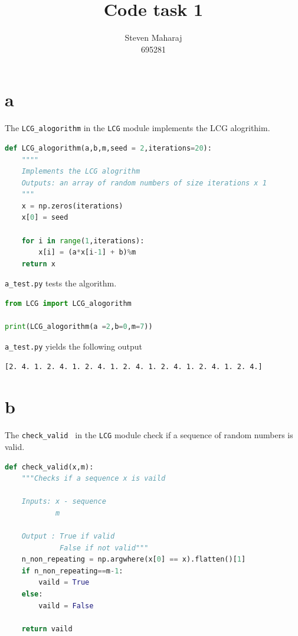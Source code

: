 \documentclass[12pt,a4paper]{article}
\author{Steven Maharaj\\695281}
\title{Code task 1}
\begin{document}
\maketitle

\section*{a}
The \texttt{LCG\_alogorithm} in the \texttt{LCG} module implements the LCG alogrithim. 
\begin{lstlisting}[language=Python, caption=LCG.LCG\_alogrithm]
def LCG_alogorithm(a,b,m,seed = 2,iterations=20):
    """"
    Implements the LCG alogrithm 
    Outputs: an array of random numbers of size iterations x 1
    """
    x = np.zeros(iterations)
    x[0] = seed

    for i in range(1,iterations):
        x[i] = (a*x[i-1] + b)%m
    return x
\end{lstlisting}
\texttt{a\_test.py} tests the algorithm.



\begin{lstlisting}[language=Python, caption=\texttt{a\_test.py}]
from LCG import LCG_alogorithm

print(LCG_alogorithm(a =2,b=0,m=7))


\end{lstlisting}

\texttt{a\_test.py} yields the following output

\begin{verbatim}
[2. 4. 1. 2. 4. 1. 2. 4. 1. 2. 4. 1. 2. 4. 1. 2. 4. 1. 2. 4.]
\end{verbatim}

\section*{b}

The \texttt{check\_valid } in the \texttt{LCG} module check if a sequence of random numbers is valid.

\begin{lstlisting}[language=Python, caption=\texttt{LCG.check\_valid}]
def check_valid(x,m):
    """Checks if a sequence x is vaild
    
    Inputs: x - sequence
            m 
            
    Output : True if valid
             False if not valid"""
    n_non_repeating = np.argwhere(x[0] == x).flatten()[1] 
    if n_non_repeating==m-1:
        vaild = True
    else:
        vaild = False

    return vaild
\end{lstlisting}
\end{document}
